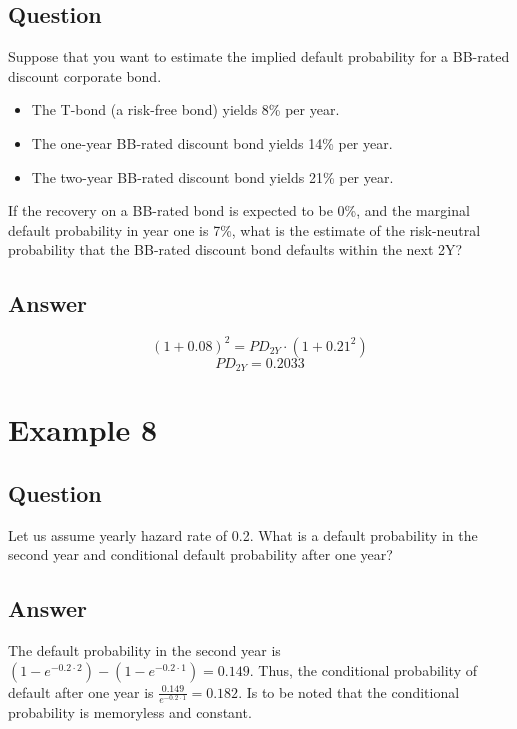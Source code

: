 \subsection{Question}
Suppose that you want to estimate the implied default probability for a BB-rated discount corporate bond.
\begin{itemize}
	\item The T-bond (a risk-free bond) yields 8\% per year.
	\item The one-year BB-rated discount bond yields 14\% per year.
	\item The two-year BB-rated discount bond yields 21\% per year.
\end{itemize}
If the recovery on a BB-rated bond is expected to be 0\%, and the marginal default probability in year one is 7\%, what is the estimate of the risk-neutral probability that the BB-rated discount bond defaults within the next 2Y?

\subsection{Answer}
\begin{equation*}
(1 + 0.08)^2 = PD_{2Y} \cdot (1 + 0.21^2)
\end{equation*}
\begin{equation*}
PD_{2Y} = 0.2033
\end{equation*}

\section{Example 8}

\subsection{Question}
Let us assume yearly hazard rate of 0.2. What is a default probability in the second year and conditional default probability after one year?

\subsection{Answer}
The default probability in the second year is $(1 - e^{-0.2 \cdot 2}) - (1 - e^{-0.2 \cdot 1}) = 0.149$. Thus, the conditional probability of default after one year is $\frac{0.149}{e^{-0.2 \cdot 1}} = 0.182$. Is to be noted that the conditional probability is memoryless and constant.

